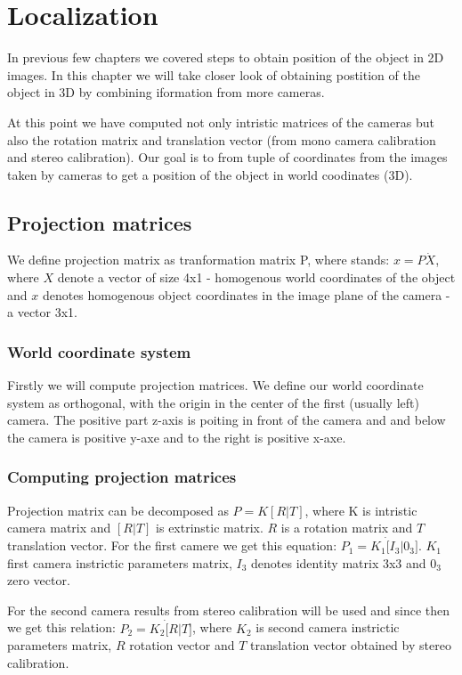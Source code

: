 \chapter{Localization}

In previous few chapters we covered steps to obtain position of the object in
2D images. In this chapter we will take closer look of obtaining postition of
the object in 3D by combining iformation from more cameras.

At this point we have computed not only intristic matrices of the cameras but
also the rotation matrix and translation vector (from mono camera calibration
and stereo calibration). Our goal is to from tuple of coordinates from the
images taken by cameras to get a position of the object in world coodinates
(3D).

\section{Projection matrices}
We define projection matrix as tranformation matrix P, where stands: $x = P
\dot X$, where $X$ denote a vector of size 4x1 - homogenous world coordinates
of the object and $x$ denotes homogenous object coordinates in the image plane
of the camera - a vector 3x1.

\subsection{World coordinate system}
Firstly we will compute projection matrices. We define our world coordinate
system as orthogonal, with the origin in the center of the first (usually left)
camera. The positive part z-axis is poiting in front of the camera and and
below the camera is positive y-axe and to the right is positive x-axe.

\subsection{Computing projection matrices}
Projection matrix can be decomposed as $P = K[R|T]$, where K is intristic
camera matrix and $[R|T]$ is extrinstic matrix. $R$ is a rotation matrix and
$T$ translation vector. For the first camere we get this equation: $ P_1 = K_1
\dot [I_3 | 0_3]$. $K_1$ first camera instrictic parameters matrix, $I_3$
denotes identity matrix 3x3 and $0_3$ zero vector.


For the second camera results from stereo calibration will be used and since
then we get this relation: $P_2 = K_2 \dot [R | T]$, where $K_2$ is second
camera instrictic parameters matrix, $R$ rotation vector and $T$ translation
vector obtained by stereo calibration.

